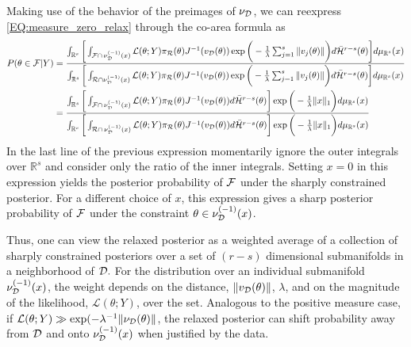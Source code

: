 \documentclass[10pt,fleqn]{article}
\DeclareMathOperator{\1}{\mathbbm{1}} \DeclareMathOperator{\bigO}{\mc O}
\begin{document}
Making use of the behavior of the preimages of $\nu_{\mathcal{D}}$, we can reexpress \eqref{EQ:measure_zero_relax} through the co-area formula as 
\begin{equation}
\begin{aligned}
P(\theta \in \mathcal{F} |Y) &= \frac{\int_{\mathbb{R}^s} \bigg[\int_{\mathcal{F} \cap \,\nu_{\mathcal{D}}^{(-1)}(x)  } \mathcal{L}(\theta;Y)\pi_{\mathcal{R}}(\theta) J^{-1}(v_\mathcal{D}(\theta)) \exp\bigg(-\frac{1}{\lambda}  \sum_{j=1}^s \| v_j(\theta)\|\bigg)d\bar{\mathcal{H}}^{r-s}(\theta)  \bigg] d\mu_{\mathbb{R}^s }(x) }{\int_{\mathbb{R}^s}\bigg[\int_{\mathcal{R} \cap \nu_{\mathcal{D}}^{(-1)}(x)  } \mathcal{L}(\theta;Y)\pi_{\mathcal{R}}(\theta) J^{-1}(v_\mathcal{D}(\theta)) \exp\bigg(-\frac{1}{\lambda}   \sum_{j=1}^s \| v_j(\theta)\|\bigg)d\bar{\mathcal{H}}^{r-s}(\theta)  \bigg] d\mu_{\mathbb{R}^s }(x) } \\
&= \frac{\int_{\mathbb{R}^s} \bigg[\int_{\mathcal{F} \cap \,\nu_{\mathcal{D}}^{(-1)}(x)   } \mathcal{L}(\theta;Y)\pi_{\mathcal{R}}(\theta) J^{-1}(v_\mathcal{D}(\theta)) d\bar{\mathcal{H}}^{r-s}(\theta)  \bigg] \exp\bigg(-\frac{1}{\lambda}  \|x\|_1 \bigg) d\mu_{\mathbb{R}^s }(x) }{\int_{\mathbb{R}^s}\bigg[\int_{\mathcal{R} \cap \,\nu_{\mathcal{D}}^{(-1)}(x)   } \mathcal{L}(\theta;Y)\pi_{\mathcal{R}}(\theta) J^{-1}(v_\mathcal{D}(\theta)) d\bar{\mathcal{H}}^{r-s}(\theta)  \bigg] \exp\bigg(-\frac{1}{\lambda}  \|x\|_1\bigg)d\mu_{\mathbb{R}^s }(x) } 
\end{aligned}
\end{equation}
In the last line of the previous expression momentarily ignore the outer integrals over $\mathbb{R}^s$ and consider only the ratio of the inner integrals.  Setting $x=0$ in this expression yields the posterior probability of $\mathcal{F}$ under the sharply constrained posterior. For a different choice of $x$, this expression gives a sharp posterior probability of $\mathcal{F}$ under the constraint $\theta\in \nu_{\mathcal{D}}^{(-1)}(x)$. 

Thus, one can view the relaxed posterior as a weighted average of a collection of sharply constrained posteriors over a set of $(r-s)$ dimensional submanifolds in a neighborhood of $\mathcal{D}.$ For the distribution over an individual submanifold $\nu_{\mathcal{D}}^{(-1)}(x)$, the weight depends on the distance, $\| v_{\mathcal{D}}(\theta)\|$, $\lambda$, and on the magnitude of the likelihood, $\mathcal{L}(\theta;Y)$, over the set. Analogous to the positive measure case, if $\mathcal{L}(\theta;Y)\gg \exp(-\lambda^{-1}\|\nu_{\mathcal{D}}(\theta)\|$, the relaxed posterior can shift probability away from $\mathcal{D}$ and onto $\nu_{\mathcal{D}}^{(-1)}(x)$ when justified by the data. 
\end{document}
